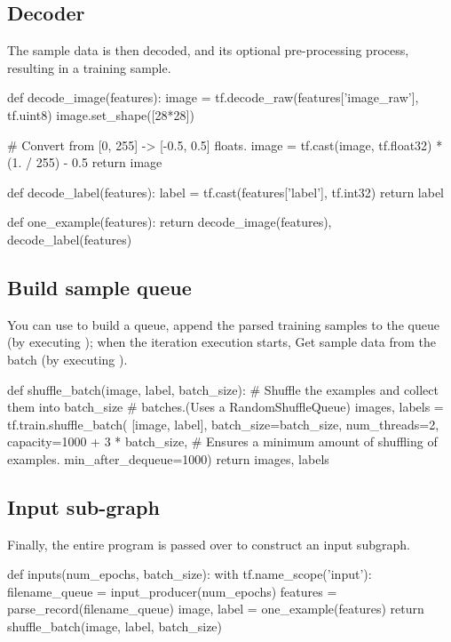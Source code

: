\begin{content}
\subsection{Decoder}

The sample data is then decoded, and its optional pre-processing process, resulting in a training sample.

\begin{leftbar}
\begin{python}
def decode_image(features):
  image = tf.decode_raw(features['image_raw'], tf.uint8)
  image.set_shape([28*28])

  # Convert from [0, 255] -> [-0.5, 0.5] floats.
  image = tf.cast(image, tf.float32) * (1. / 255) - 0.5
  return image

def decode_label(features):
  label = tf.cast(features['label'], tf.int32)
  return label

def one_example(features):
  return decode_image(features), decode_label(features)
\end{python}
\end{leftbar}


\subsection{Build sample queue}

You can use  to build a  queue, append the parsed training samples to the queue (by executing ); when the iteration execution starts, Get  sample data from the batch (by executing ).

\begin{leftbar}
\begin{python}
def shuffle_batch(image, label, batch_size):
    # Shuffle the examples and collect them into batch\_size
    # batches.(Uses a RandomShuffleQueue)
    images, labels = tf.train.shuffle_batch(
      [image, label], batch_size=batch_size, num_threads=2,
      capacity=1000 + 3 * batch_size,
      # Ensures a minimum amount of shuffling of examples.
      min_after_dequeue=1000)
    return images, labels
\end{python}
\end{leftbar}


\subsection{Input sub-graph}

Finally, the entire program is passed over to construct an input subgraph.

\begin{leftbar}
\begin{python}
def inputs(num_epochs, batch_size):
  with tf.name_scope('input'):
    filename_queue = input_producer(num_epochs)
    features = parse_record(filename_queue)
    image, label = one_example(features)
    return shuffle_batch(image, label, batch_size)
\end{python}
\end{leftbar}

\end{content}


